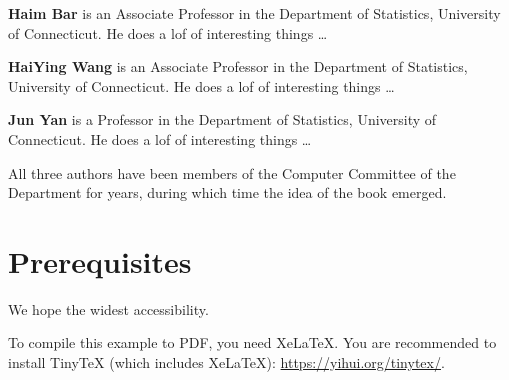 \textbf{Haim Bar} is an Associate Professor in the Department of Statistics,
University of Connecticut. He does a lof of interesting things \ldots{}

\textbf{HaiYing Wang} is an Associate Professor in the Department of Statistics,
University of Connecticut. He does a lof of interesting things \ldots{}

\textbf{Jun Yan} is a Professor in the Department of Statistics,
University of Connecticut. He does a lof of interesting things \ldots{}

All three authors have been members of the Computer Committee of the Department
for years, during which time the idea of the book emerged.

\hypertarget{prerequisites}{%
\chapter*{Prerequisites}\label{prerequisites}}


We hope the widest accessibility.

To compile this example to PDF, you need XeLaTeX. You are recommended to install
TinyTeX (which includes XeLaTeX): \url{https://yihui.org/tinytex/}.

